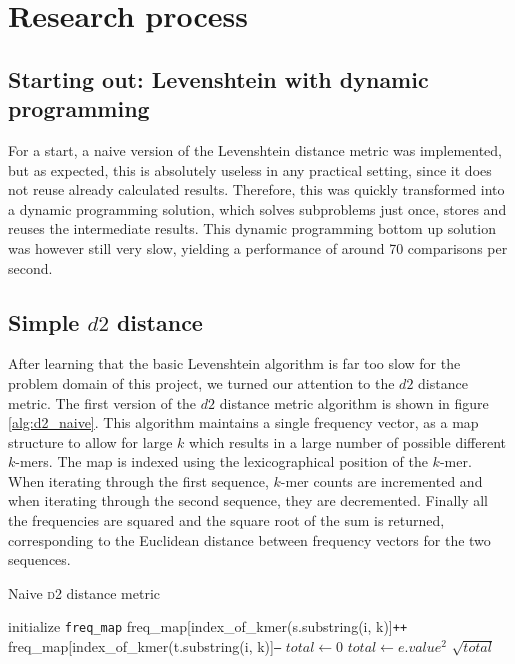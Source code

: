 \section{Research process}
\subsection{Starting out: Levenshtein with dynamic programming}
For a start, a naive version of the Levenshtein distance metric was
implemented, but as expected, this is absolutely useless in any practical
setting, since it does not reuse already calculated results. Therefore, this
was quickly transformed into a dynamic programming solution, which solves
subproblems just once, stores and reuses the intermediate results. This dynamic
programming bottom up solution was however still very slow, yielding a
performance of around 70 comparisons per second.

\subsection{Simple $d2$ distance}
After learning that the basic Levenshtein algorithm is far too slow for the
problem domain of this project, we turned our attention to the $d2$ distance
metric. The first version of the $d2$ distance metric algorithm is shown in
figure \ref{alg:d2_naive}. This algorithm maintains a single frequency vector,
as a map structure to allow for large $k$ which results in a large number of
possible different $k$-mers. The map is indexed using the lexicographical
position of the $k$-mer. When iterating through the first sequence, $k$-mer
counts are incremented and when iterating through the second sequence, they are
decremented. Finally all the frequencies are squared and the square root of the
sum is returned, corresponding to the Euclidean distance between frequency
vectors for the two sequences.

\begin{algorithm}
  \caption{Naive \textsc{d2} distance metric}
  \label{alg:d2_naive}
  \begin{algorithmic}[1]
    \Statex
      \State initialize \texttt{freq\_map}
        \State freq\_map[index\_of\_kmer(s.substring(i, k)]\texttt{++}
      \EndFor
        \State freq\_map[index\_of\_kmer(t.substring(i, k)]\texttt{--}
      \EndFor
      \State $total \gets 0$
        \State $total \gets e.value^2$  
      \EndFor
      \State \Return $\sqrt{total}$
    \EndFunction
  \end{algorithmic}
\end{algorithm}


